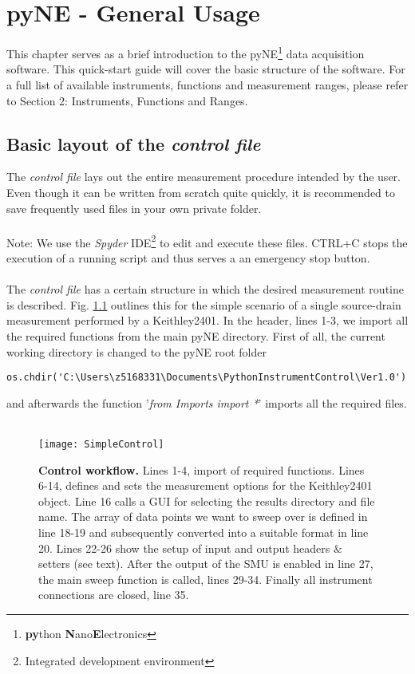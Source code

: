 \chapter{pyNE - General Usage}
\label{Chap:GeneralUsage}
\lettrine[lines=2]{\color{myBrown}\textsf{T}}{}his chapter serves as a brief introduction to the pyNE\footnote{\textbf{py}thon \textbf{N}ano\textbf{E}lectronics} data acquisition software. This quick-start guide will cover the basic structure of the software. For a full list of available instruments, functions and measurement ranges, please refer to Section 2: Instruments, Functions and Ranges.\\
\section{Basic layout of the \textit{control file}}
The \textit{control file} lays out the entire measurement procedure intended by the user. Even though it can be written from scratch quite quickly, it is recommended to save frequently used files in your own private folder.\\
\\
Note: We use the \textit{Spyder} IDE\footnote{Integrated development environment} to edit and execute these files. CTRL+C stops the execution of a running script and thus serves a an emergency stop button.\\
\\
The \textit{control file} has a certain structure in which the desired measurement routine is described. Fig. \ref{Fig:SimpleControl} outlines this for the simple scenario of a single source-drain measurement performed by a Keithley2401. In the header, lines 1-3, we import all the required functions from the main pyNE directory. First of all, the current working directory is changed to the pyNE root folder
\begin{verbatim}
os.chdir('C:\Users\z5168331\Documents\PythonInstrumentControl\Ver1.0')
\end{verbatim}
and afterwards the function '\textit{from Imports import *}' imports all the required files.\\
\\
\begin{figure}[h]
\texttt{[image: SimpleControl]}
\caption{\textbf{Control workflow.} Lines 1-4, import of required functions. Lines 6-14, defines and sets the measurement options for the Keithley2401 object. Line 16 calls a GUI for selecting the results directory and file name. The array of data points we want to sweep over is defined in line 18-19 and subsequently converted into a suitable format in line 20. Lines 22-26 show the setup of input and output headers $\textsf{\&}$ setters (see text). After the output of the SMU is enabled in line 27, the main sweep function is called, lines 29-34. Finally all instrument connections are closed, line 35.}
\label{Fig:SimpleControl}
\end{figure} 
